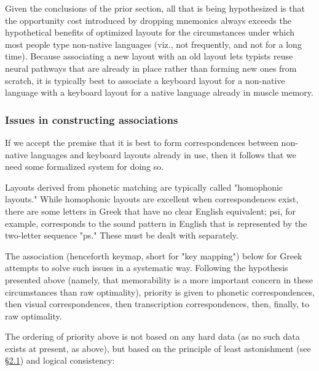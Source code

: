\documentclass[11pt]{article}
\begin{document}
Given the conclusions of the prior section, all that is being hypothesized is that the opportunity cost introduced by dropping mnemonics always exceeds the hypothetical benefits of optimized layouts for the circumstances under which most people type non-native languages (viz., not frequently, and not for a long time). Because associating a new layout with an old layout lets typists reuse neural pathways that are already in place rather than forming new ones from scratch, it is typically best to associate a keyboard layout for a non-native language with a keyboard layout for a native language already in muscle memory.

\subsubsection{Issues in constructing associations}
\label{sec:orgd5c000b}

If we accept the premise that it is best to form correspondences between non-native languages and keyboard layouts already in use, then it follows that we need some formalized system for doing so.

Layouts derived from phonetic matching are typically called "homophonic layouts." While homophonic layouts are excellent when correspondences exist, there are some letters in Greek that have no clear English equivalent; psi, for example, corresponds to the sound pattern in English that is represented by the two-letter sequence "ps." These must be dealt with separately.

The association (henceforth keymap, short for "key mapping") below for Greek attempts to solve such issues in a systematic way. Following the hypothesis presented above (namely, that memorability is a more important concern in these circumstances than raw optimality), priority is given to phonetic correspondences, then visual correspondences, then transcription correspondences, then, finally, to raw optimality.

The ordering of priority above is not based on any hard data (as no such data exists at present, as above), but based on the principle of least astonishment (see \hyperref[sec:orgd2ef37c]{§2.1}) and logical consistency:
\end{document}
